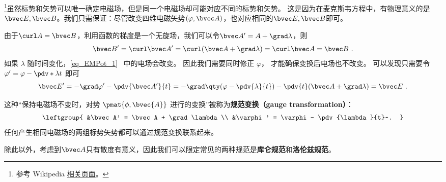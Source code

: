 
\begin{issues}
\issueDraft 
\end{issues}


\footnote{参考 Wikipedia \href{https://en.wikipedia.org/wiki/Gauge_fixing}{相关页面}。}虽然标势和矢势可以唯一确定电磁场，但是同一个电磁场却可能对应不同的标势和矢势。 这是因为在麦克斯韦方程中，有物理意义的是$\bvec E,\bvec B$。我们只需保证：尽管改变四维电磁矢势$(\varphi,\bvec A)$，也对应相同的$\bvec E,\bvec B$即可。

由于$\curl  A=\bvec B$，利用函数的梯度是一个无旋场，我们可以令$\bvec A'=A+\grad\lambda$，则
\begin{equation}
\bvec B' = \curl \bvec A' = \curl (\bvec A + \grad \lambda) = \curl \bvec A = \bvec B~.
\end{equation}
 如果 $\lambda$ 随时间变化，\autoref{eq_EMPot_1}~ 中的电场会改变。 因此我们需要同时修正 $\varphi$， 才能确保变换后电场也不改变。 可以发现只需要令 $\varphi' = \varphi - \pdv*{\lambda}{t}$ 即可
\begin{equation}
\bvec E' = -\grad \varphi' - \pdv{\bvec A'}{t} = -\grad \qty(\varphi - \pdv{\lambda}{t}) - \pdv{t} (\bvec A + \grad \lambda) = \bvec E~.
\end{equation}


这种“保持电磁场不变时，对势 $\pmat{\phi, \bvec{A}}$ 进行的变换”被称为\textbf{规范变换（gauge transformation）}：
\begin{equation}\label{eq_Gauge_3}
\leftgroup{
&\bvec A' = \bvec A + \grad \lambda\\
&\varphi' = \varphi - \pdv{\lambda}{t}~.
}\end{equation}
任何产生相同电磁场的两组标势矢势都可以通过规范变换联系起来。

除此以外，考虑到$\bvec A$只有散度有意义，因此我们可以限定$$常见的两种规范是\textbf{库仑规范}和\textbf{洛伦兹规范}。
